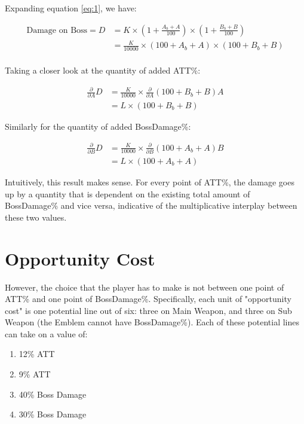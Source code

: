\documentclass{article}
\begin{document}
Expanding equation \eqref{eq:1}, we have:

\begin{align*}
    \text{Damage on Boss} = D & = K \times \left( 1+\frac{A_b+A}{100} \right) \times \left( 1 + \frac{B_b + B}{100} \right) \\ 
                              & = \frac{K}{10000} \times \left( 100 + A_b + A \right) \times \left( 100 + B_b + B \right) \\
\end{align*}

Taking a closer look at the quantity of added ATT\%:

\begin{align*} 
    \frac{\partial}{\partial A} D & = \frac{K}{10000} \times \frac{\partial}{\partial A} (100 + B_b + B) A \\
                                  & = L \times (100 + B_b + B)
\end{align*}

Similarly for the quantity of added BossDamage\%:

\begin{align*}
    \frac{\partial}{\partial B} D & = \frac{K}{10000} \times \frac{\partial}{\partial B} (100 + A_b + A) B \\
                                  & = L \times (100 + A_b + A)
\end{align*}

Intuitively, this result makes sense. For every point of ATT\%, the damage goes up by a quantity that is dependent on the existing total amount of BossDamage\% and vice versa, indicative of the multiplicative interplay between these two values.

\section{Opportunity Cost}

However, the choice that the player has to make is not between one point of ATT\% and one point of BossDamage\%. Specifically, each unit of "opportunity cost" is one potential line out of six: three on Main Weapon, and three on Sub Weapon (the Emblem cannot have BossDamage\%). Each of these potential lines can take on a value of:

\begin{enumerate}
    \item 12\% ATT
    \item 9\% ATT
    \item 40\% Boss Damage
    \item 30\% Boss Damage
\end{enumerate}
\end{document}

